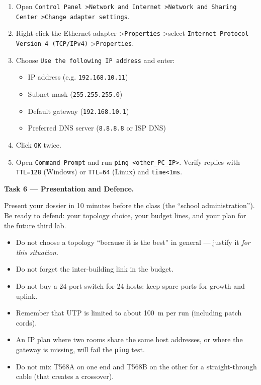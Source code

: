 \documentclass[11pt]{article}
\begin{document}
\begin{methode}
\begin{enumerate}
\item Open \texttt{Control Panel \textgreater Network and Internet \textgreater Network and Sharing Center \textgreater Change adapter settings}.
\item Right-click the Ethernet adapter \textgreater \texttt{Properties} \textgreater select \texttt{Internet Protocol Version 4 (TCP/IPv4)} \textgreater \texttt{Properties}.
\item Choose \texttt{Use the following IP address} and enter:
\begin{itemize}
\item IP address (e.g. \texttt{192.168.10.11})
\item Subnet mask (\texttt{255.255.255.0})
\item Default gateway (\texttt{192.168.10.1})
\item Preferred DNS server (\texttt{8.8.8.8} or ISP DNS)
\end{itemize}
\item Click \texttt{OK} twice.
\item Open \texttt{Command Prompt} and run \texttt{ping <other\_PC\_IP>}. Verify replies with \texttt{TTL=128} (Windows) or \texttt{TTL=64} (Linux) and \texttt{time<1ms}.
\end{enumerate}
\end{methode}

\textbf{Task 6 — Presentation and Defence.}\par
Present your dossier in 10 minutes before the class (the ``school administration''). Be ready to defend: your topology choice, your budget lines, and your plan for the future third lab.

\begin{attention}
\begin{itemize}
\item Do not choose a topology ``because it is the best'' in general — justify it \emph{for this situation}.
\item Do not forget the inter-building link in the budget.
\item Do not buy a 24-port switch for 24 hosts: keep spare ports for growth and uplink.
\item Remember that UTP is limited to about \SI{100}{m} per run (including patch cords).
\item An IP plan where two rooms share the same host addresses, or where the gateway is missing, will fail the \texttt{ping} test.
\item Do not mix T568A on one end and T568B on the other for a straight-through cable (that creates a crossover).
\end{itemize}
\end{attention}
\end{document}
